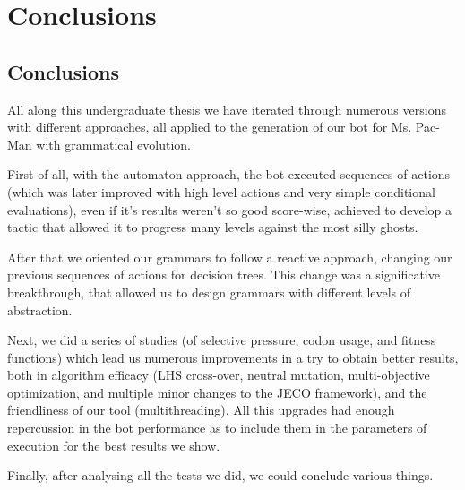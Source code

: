 \chapter{Conclusions} \label{cap:conclusions}

\section{Conclusions}
All along this undergraduate thesis we have iterated through numerous versions with different approaches, all applied to the generation of our bot for Ms. Pac-Man with grammatical evolution.
 
First of all, with the automaton approach, the bot executed sequences of actions (which was later improved with high level actions and very simple conditional evaluations), even if it’s results weren’t so good score-wise, achieved to develop a tactic that allowed it to progress many levels against the most silly ghosts.
 
After that we oriented our grammars to follow a reactive approach, changing our previous sequences of actions for decision trees. This change was a significative breakthrough, that allowed us to design grammars with different levels of abstraction.
 
Next, we did a series of studies (of selective pressure, codon usage, and fitness functions) which lead us numerous improvements in a try to obtain better results, both in algorithm efficacy (LHS cross-over, neutral mutation, multi-objective optimization, and multiple minor changes to the JECO framework), and the friendliness of our tool (multithreading). All this upgrades had enough repercussion in the bot performance as to include them in the parameters of execution for the best results we show.
 
Finally, after analysing all the tests we did, we could conclude various things.
 
